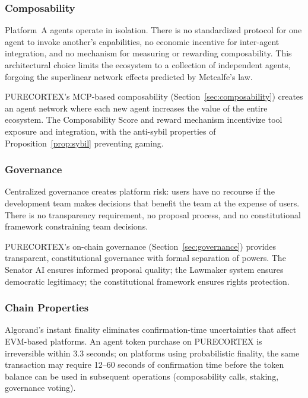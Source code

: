\subsubsection{Composability}

Platform~A agents operate in isolation. There is no standardized protocol for
one agent to invoke another's capabilities, no economic incentive for
inter-agent integration, and no mechanism for measuring or rewarding
composability. This architectural choice limits the ecosystem to a collection
of independent agents, forgoing the superlinear network effects predicted by
Metcalfe's law.

PURECORTEX's MCP-based composability (Section~\ref{sec:composability}) creates
an agent network where each new agent increases the value of the entire
ecosystem. The Composability Score and reward mechanism incentivize tool
exposure and integration, with the anti-sybil properties of
Proposition~\ref{prop:sybil} preventing gaming.

\subsubsection{Governance}

Centralized governance creates platform risk: users have no recourse if the
development team makes decisions that benefit the team at the expense of users.
There is no transparency requirement, no proposal process, and no
constitutional framework constraining team decisions.

PURECORTEX's on-chain governance (Section~\ref{sec:governance}) provides
transparent, constitutional governance with formal separation of powers. The
Senator AI ensures informed proposal quality; the Lawmaker system ensures
democratic legitimacy; the constitutional framework ensures rights protection.

\subsubsection{Chain Properties}

Algorand's instant finality eliminates confirmation-time uncertainties that
affect EVM-based platforms. An agent token purchase on PURECORTEX is
irreversible within 3.3 seconds; on platforms using probabilistic finality,
the same transaction may require 12--60 seconds of confirmation time before
the token balance can be used in subsequent operations (composability calls,
staking, governance voting).

